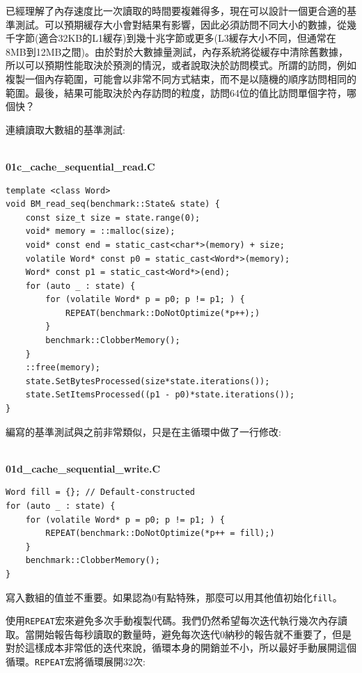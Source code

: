 
已經理解了內存速度比一次讀取的時間要複雜得多，現在可以設計一個更合適的基準測試。可以預期緩存大小會對結果有影響，因此必須訪問不同大小的數據，從幾千字節(適合32KB的L1緩存)到幾十兆字節或更多(L3緩存大小不同，但通常在8MB到12MB之間)。由於對於大數據量測試，內存系統將從緩存中清除舊數據，所以可以預期性能取決於預測的情況，或者說取決於訪問模式。所謂的訪問，例如複製一個內存範圍，可能會以非常不同方式結束，而不是以隨機的順序訪問相同的範圍。最後，結果可能取決於內存訪問的粒度，訪問64位的值比訪問單個字符，哪個快？

連續讀取大數組的基準測試:

\hspace*{\fill} \\ %
\noindent
\textbf{01c\_cache\_sequential\_read.C}
\begin{lstlisting}[style=styleCXX]
template <class Word>
void BM_read_seq(benchmark::State& state) {
	const size_t size = state.range(0);
	void* memory = ::malloc(size);
	void* const end = static_cast<char*>(memory) + size;
	volatile Word* const p0 = static_cast<Word*>(memory);
	Word* const p1 = static_cast<Word*>(end);
	for (auto _ : state) {
		for (volatile Word* p = p0; p != p1; ) {
			REPEAT(benchmark::DoNotOptimize(*p++);)
		}
		benchmark::ClobberMemory();
	}
	::free(memory);
	state.SetBytesProcessed(size*state.iterations());
	state.SetItemsProcessed((p1 - p0)*state.iterations());
}
\end{lstlisting}

編寫的基準測試與之前非常類似，只是在主循環中做了一行修改:

\hspace*{\fill} \\ %
\noindent
\textbf{01d\_cache\_sequential\_write.C}
\begin{lstlisting}[style=styleCXX]
Word fill = {}; // Default-constructed
for (auto _ : state) {
	for (volatile Word* p = p0; p != p1; ) {
		REPEAT(benchmark::DoNotOptimize(*p++ = fill);)
	}
	benchmark::ClobberMemory();
}
\end{lstlisting}

寫入數組的值並不重要。如果認為0有點特殊，那麼可以用其他值初始化\texttt{fill}。

使用\texttt{REPEAT}宏來避免多次手動複製代碼。我們仍然希望每次迭代執行幾次內存讀取。當開始報告每秒讀取的數量時，避免每次迭代0納秒的報告就不重要了，但是對於這樣成本非常低的迭代來說，循環本身的開銷並不小，所以最好手動展開這個循環。\texttt{REPEAT}宏將循環展開32次:

